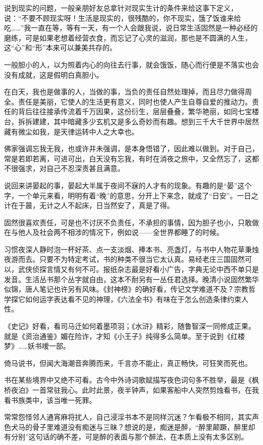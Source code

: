 \par 说到现实的问题，一般亲朋好友总拿针对现实生计的条件来给这事下定义，说：“不要不顾现实呀！生活是现实的，很残酷的，你不现实，饿了饭谁来给吃……”我一直在等，等有一天，有一个人会跟我说，说日常生活固然是一种必经的磨练，可是如果老想着经营衣食，而忘记了心灵的滋润，那也是不圆满的人生，这“心”和“形”本来可以兼美共存的。
\par 一般胆小的人，以为照着内心的向往去行事，就会饿饭，随心而行便是不落实也会没有成就，这是假明白真胆小。
\par 在白天，我也是做事的人，当做的事，当负的责任自然处理掉，而且尽力做得周全。责任是美丽，它使人的生活更有意义，同时也使人产生自尊自爱的推动力。责任的背后往往接承传流着千万因果，这份衍生，层层叠叠，繁华艳丽，如同七宝楼台，拆拆建建，其中暗藏多少玄机又是多么奇妙而有趣。想到三千大千世界中居然藏有微尘如我，是天律运转中人之大幸也。
\par 佛家强调忘我无我，也或许并未强调，是本身悟错了，因此难以做到。对于自己，常是若即若离，可进可出，白天没有忘我，有时在消夜之旅中，又全然忘了，这都不很强求，对自己不忍深责甚且满意。
\par 说回来讲晏起的事，晏起大半属于夜间不寐的人才有的现象。有趣的是“晏”这个字，一个单元来看，明明有着“晚”的意思，分开上下来念，就成了“日安”。一日之计在于晨，无计之人不起床，日当然安了，真是了得。
\par 固然很喜欢责任，可是也不讨厌不负责任，不承担的事情，因为胆子也小，只敢做在与他人及社会两不相涉的情况下，例如说——全世界都睡了的时候。
\par 习惯夜深人静时泡一杯好茶、点一支淡烟、捧本书、亮盏灯，与书中人物花草秉烛夜游而去。只要不为特定考试，书的种类不很当它太认真。易经老庄三国固然可以，武侠侦探言情又有何不可。报纸杂志最是好看小广告，字典无论中西不单只是发音。生活丛书那个丛字就自由，这本不耐另有一丛任君选择。晚清小说固然繁华似锦，唐人笔记也许另有风味。《封神榜》的确好看，传记文学难道不及？宗教哲学探它如何运字表达看不见的神理，《六法全书》有味在于怎么创造条律约束人性。
\par 《史记》好看，看司马迁如何着墨项羽；《水浒》精彩，随鲁智深一同修成正果。就是《资治通鉴》媚在险诈，才知《小王子》纯得多么简单。至于说到《红楼梦》……妖书嗳一部。
\par 倚马说书，但闻大海潮音奔腾而来，千言亦不能止，真正畅快，可狂笑而死也。
\par 书在某些境界中又绝不可看。古今中外诗词歌赋描写夜色词句多不胜举，最是《枫桥夜泊》一首常驻我心。此时此景，夜半钟声，如果客船中人突然剪烛看书，在我看书族类中，该当唯一死罪。
\par 常常怨怪邻人通宵麻将扰人，自己浸淫书本不是同样沉迷？乍看极不相同，其实声色犬马的骨子里难道没有痴迷与三昧？想说的是，痴迷是醉，“醉里颠蹶，醉里却有分别”这句话的确不差，可是醉的表面与那个醉法，在本质上没有太多区别。
